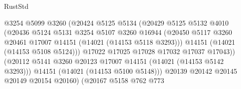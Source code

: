 \begin{lexlean}{RustStd}
\begin{coremodule}
                                        @3254
                                        @5099
                                        @3260
                                        (@20424
                                          @5125
                                          @5134
                                          (@20429
                                            @5125
                                            @5132
                                            @4010
                                            (@20436
                                              @5124
                                              @5131
                                              @3254
                                              @5107
                                              @3260
                                              @16944
                                              (@20450
                                                @5117
                                                @3260
                                                @20461
                                                @17007
                                                @14151
                                                (@14021 (@14153 @5118 @3293)))
                                              @14151
                                              (@14021 (@14153 @5108 @5124)))
                                            @17022
                                            @17025
                                            @17028
                                            @17032
                                            @17037
                                            @17043))
                                        (@20112
                                          @5141
                                          @3260
                                          @20123
                                          @17007
                                          @14151
                                          (@14021 (@14153 @5142 @3293)))
                                        @14151
                                        (@14021 (@14153 @5100 @5148)))
                                      @20139
                                      @20142
                                      @20145
                                      @20149
                                      @20154
                                      @20160)
                                    (@20167
                                      @5158
                                      @762
                                      @773

\end{coremodule}
\end{lexlean}
